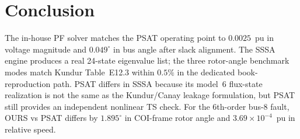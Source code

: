 \documentclass[11pt,a4paper]{article}
\begin{document}
\section{Conclusion}
The in-house PF solver matches the PSAT operating point to $0.0025$~pu in
voltage magnitude and $0.049^\circ$ in bus angle after slack alignment.  The
SSSA engine produces a real 24-state eigenvalue list; the three rotor-angle
benchmark modes match Kundur Table~E12.3 within $0.5\%$ in the dedicated
book-reproduction path.  PSAT differs in SSSA because its model~6 flux-state
realization is not the same as the Kundur/Canay leakage formulation, but PSAT
still provides an independent nonlinear TS check.  For the 6th-order bus-8
fault, OURS vs PSAT differs by $1.895^\circ$ in COI-frame rotor angle and
$3.69\times10^{-4}$~pu in relative speed.
\end{document}
